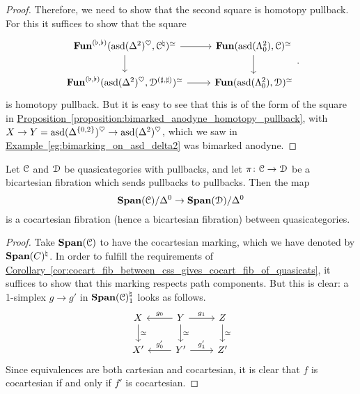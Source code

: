 \documentclass[main.tex]{subfiles}
\begin{document}
\begin{proof}
  Therefore, we need to show that the second square is homotopy pullback. For this it suffices to show that the square
  \begin{equation*}
    \begin{tikzcd}
      \Fun^{(\flat, \flat)}(\asd(\Delta^{2})^{\heartsuit}, \category{C}^{\natural})^{\simeq}
      \arrow[r]
      \arrow[d]
      & \Fun(\asd(\Lambda^{2}_{0}), \category{C})^{\simeq}
      \arrow[d]
      \\
      \Fun^{(\flat, \flat)}(\asd(\Delta^{2})^{\heartsuit}, \category{D}^{(\sharp, \sharp)})^{\simeq}
      \arrow[r]
      & \Fun(\asd(\Lambda^{2}_{0}), \category{D})^{\simeq}
    \end{tikzcd}.
  \end{equation*}
  is homotopy pullback. But it is easy to see that this is of the form of the square in \hyperref[proposition:bimarked_anodyne_homotopy_pullback]{Proposition~\ref*{proposition:bimarked_anodyne_homotopy_pullback}}, with $X \to Y = \mathrm{asd}(\Delta^{\{0, 2\}})^{\heartsuit} \to \mathrm{asd}(\Delta^{2})^{\heartsuit}$, which we saw in \hyperref[eg:bimarking_on_asd_delta2]{Example~\ref*{eg:bimarking_on_asd_delta2}} was bimarked anodyne.
\end{proof}

\begin{theorem}
  Let $\mathcal{C}$ and $\mathcal{D}$ be quasicategories with pullbacks, and let $\pi\colon \mathcal{C} \to \mathcal{D}$ be a bicartesian fibration which sends pullbacks to pullbacks. Then the map
  \begin{equation*}
    \mathbf{Span}(\mathcal{C})/\Delta^{0} \to \mathbf{Span}(\mathcal{D})/\Delta^{0}
  \end{equation*}
  is a cocartesian fibration (hence a bicartesian fibration) between quasicategories.
\end{theorem}
\begin{proof}
  Take $\mathbf{Span}(\mathcal{C})$ to have the cocartesian marking, which we have denoted by $\mathbf{Span}(C)^{\natural}$. In order to fulfill the requirements of \hyperref[cor:cocart_fib_between_css_gives_cocart_fib_of_quasicats]{Corollary~\ref*{cor:cocart_fib_between_css_gives_cocart_fib_of_quasicats}}, it suffices to show that this marking respects path components. But this is clear: a 1-simplex $g \to g'$ in $\mathbf{Span}(\mathcal{C})^{\natural}_{1}$ looks as follows.
  \begin{equation*}
    \begin{tikzcd}
      X
      \arrow[d, "\simeq"]
      & Y
      \arrow[l, swap, "g_{0}"]
      \arrow[r, "g_{1}"]
      \arrow[d, "\simeq"]
      & Z
      \arrow[d, "\simeq"]
      \\
      X'
      & Y'
      \arrow[l, swap, "g'_{0}"]
      \arrow[r, "g'_{1}"]
      & Z'
    \end{tikzcd}
  \end{equation*}
  Since equivalences are both cartesian and cocartesian, it is clear that $f$ is cocartesian if and only if $f'$ is cocartesian.
\end{proof}
\end{document}
